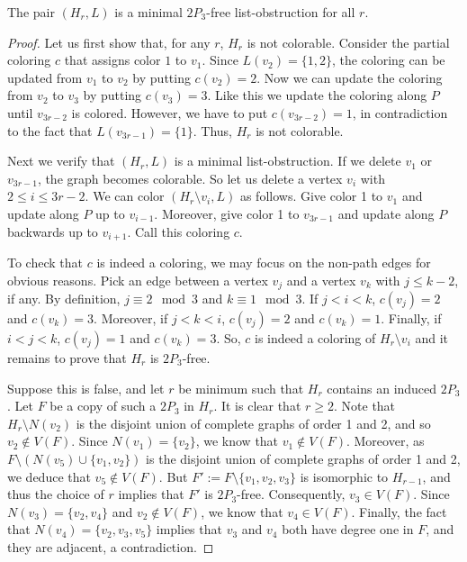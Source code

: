 \documentclass[11pt]{article}
\begin{document}
\begin{claim}
The pair $(H_r,L)$ is a minimal $2P_3$-free list-obstruction for all $r$.
\end{claim}
\begin{proof}
Let us first show that, for any $r$, $H_r$ is not colorable.
Consider the partial coloring $c$ that assigns color $1$ to $v_1$.
Since $L(v_2)=\{1,2\}$, the coloring can be updated from $v_1$ to $v_2$ by putting $c(v_2)=2$.
Now we can update the coloring from $v_2$ to $v_3$ by putting $c(v_3)=3$.
Like this we update the coloring along $P$ until $v_{3r-2}$ is colored.
However, we have to put $c(v_{3r-2})=1$, in contradiction to the fact that $L(v_{3r-1})=\{1\}$.
Thus, $H_r$ is not colorable.

Next we verify that $(H_r,L)$ is a minimal list-obstruction.
If we delete $v_1$ or $v_{3r-1}$, the graph becomes colorable.
So let us delete a vertex $v_i$ with $2 \le i \le 3r-2$.
We can color $(H_r\setminus v_i,L)$ as follows.
Give color 1 to $v_1$ and update along $P$ up to $v_{i-1}$.
Moreover, give color 1 to $v_{3r-1}$ and update along $P$ backwards up to $v_{i+1}$.
Call this coloring $c$.

To check that $c$ is indeed a coloring, we may focus on the non-path edges for obvious reasons.
Pick an edge between a vertex $v_j$ and a vertex $v_k$ with $j \le k-2$, if any.
By definition, $j \equiv 2\mod 3$ and $k \equiv 1\mod 3$.
If $j < i < k$, $c(v_j)=2$ and $c(v_k)=3$.
Moreover, if $j<k<i$, $c(v_j)=2$ and $c(v_k)=1$.
Finally, if $i<j<k$, $c(v_j)=1$ and $c(v_k)=3$.
So, $c$ is indeed a coloring of $H_r\setminus v_i$ and it remains to prove that $H_r$ is $2P_3$-free.

Suppose this is false, and let $r$ be minimum such that $H_r$ contains an induced $2P_3$.
Let $F$ be a copy of such a $2P_3$ in $H_r$.
It is clear that $r\ge 2$.
Note that $H_r \setminus N(v_2)$ is the disjoint union of complete graphs of order 1 and 2, and so $v_2 \notin V(F)$.
Since $N(v_1)=\{v_2\}$, we know that $v_1 \notin V(F)$. 
Moreover, as $F\setminus (N(v_5) \cup \{v_1,v_2\})$ is the disjoint union of complete graphs of order 1 and 2, we deduce that $v_5 \notin V(F)$.
But $F':=F\setminus \{v_1,v_2,v_3\}$ is isomorphic to $H_{r-1}$, and thus the choice of $r$ implies that $F'$ is $2P_3$-free.
Consequently, $v_3 \in V(F)$.
Since $N(v_3)=\{v_2,v_4\}$ and $v_2 \notin V(F)$, we know that $v_4 \in V(F)$. 
Finally, the fact that $N(v_4)=\{v_2,v_3,v_5\}$ implies that 
$v_3$ and $v_4$ both have degree one in $F$, and they are adjacent, a
contradiction. 
\end{proof}
\end{document}
